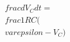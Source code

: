 \documentclass[preview]{standalone}
\begin{document}
\begin{align*}
\quad\\frac{dV_C}{dt} = \quad\\frac{1}{RC} (\quad\\varepsilon - V_C)
\end{align*}
\end{document}
